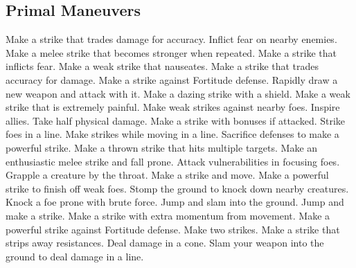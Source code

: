 \subsection{Primal Maneuvers}\label{Primal Maneuvers}
\begin{spelllist}
 Make a strike that trades damage for accuracy.
 Inflict fear on nearby enemies.
 Make a melee strike that becomes stronger when repeated.
 Make a strike that inflicts fear.
 Make a weak strike that nauseates.
 Make a strike that trades accuracy for damage.
 Make a strike against Fortitude defense.
 Rapidly draw a new weapon and attack with it.
 Make a dazing strike with a shield.
 Make a weak strike that is extremely painful.
 Make weak strikes against nearby foes.
 Inspire allies.
 Take half physical damage.
 Make a strike with bonuses if attacked.
 Strike foes in a line.
 Make strikes while moving in a line.
 Sacrifice defenses to make a powerful strike.
 Make a thrown strike that hits multiple targets.
 Make an enthusiastic melee strike and fall prone.
 Attack vulnerabilities in focusing foes.
 Grapple a creature by the throat.
 Make a strike and move.
 Make a powerful strike to finish off weak foes.
 Stomp the ground to knock down nearby creatures.
 Knock a foe prone with brute force.
 Jump and slam into the ground.
 Jump and make a strike.
 Make a strike with extra momentum from movement.
 Make a powerful strike against Fortitude defense.
 Make two strikes.
 Make a strike that strips away resistances.
 Deal damage in a cone.
 Slam your weapon into the ground to deal damage in a line.

\end{spelllist}

